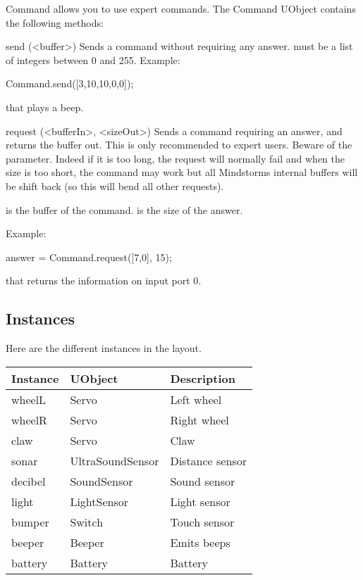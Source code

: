 Command allows you to use expert commands. The Command UObject contains the
following methods:
\begin{urbiscriptapi}
\item[send](<buffer>) Sends a command without requiring any answer.
   must be a list of integers between 0 and 255.  Example:
\begin{urbiunchecked}
  Command.send([3,10,10,0,0]);
\end{urbiunchecked}

that plays a beep.

\item[request](<bufferIn>, <sizeOut>)%
  Sends a command requiring an answer, and returns the buffer out. This is
  only recommended to expert users. Beware of the 
  parameter. Indeed if it is too long, the request will normally fail and
  when the size is too short, the command may work but all Mindstorms
  internal buffers will be shift back (so this will bend all other
  requests).

   is the buffer of the command.  is the size of
  the answer.

  Example:
\begin{urbiunchecked}
  answer = Command.request([7,0], 15);
\end{urbiunchecked}

that returns the information on input port 0.
\end{urbiscriptapi}

\subsection{Instances}
Here are the different instances in the  layout.

\begin{tabular}{|l|l|l|}
  \hline
  Instance & UObject          & Description    \\
  \hline
  wheelL   & Servo            & Left wheel     \\
  wheelR   & Servo            & Right wheel    \\
  claw     & Servo            & Claw           \\
  sonar    & UltraSoundSensor & Distance sensor\\
  decibel  & SoundSensor      & Sound sensor   \\
  light    & LightSensor      & Light sensor   \\
  bumper   & Switch           & Touch sensor   \\
  beeper   & Beeper           & Emits beeps    \\
  battery  & Battery          & Battery        \\
  \hline
\end{tabular}

